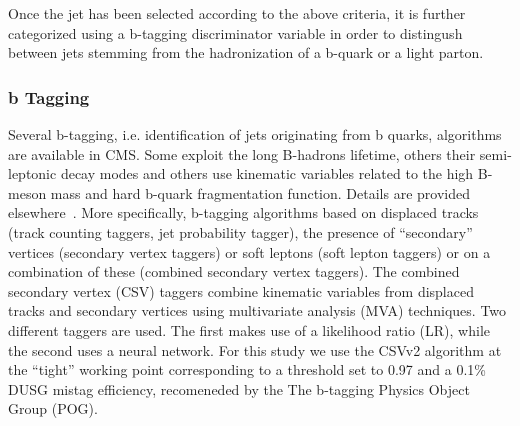  Once the jet has been selected according to the above criteria, it is further categorized using a b-tagging discriminator variable 
 in order to distingush between jets stemming from the hadronization of a b-quark or a light parton.

\subsubsection{b Tagging}

Several b-tagging, i.e. identification of jets originating from  b  quarks, algorithms are available in CMS. Some exploit the long B-hadrons lifetime, others their semi-leptonic decay modes and others use kinematic variables related to the high 
B-meson mass and hard b-quark fragmentation function. Details are provided elsewhere~\cite{CMS-PAS-BTV-10-001}. More specifically, b-tagging  algorithms  based  on  displaced  tracks (track counting taggers, jet probability tagger), the presence of ``secondary'' vertices (secondary vertex taggers) or soft leptons (soft lepton taggers) or on a combination of these (combined secondary vertex taggers).  The combined secondary vertex (CSV) taggers combine kinematic variables from displaced tracks and secondary vertices using multivariate analysis (MVA) techniques. Two different taggers are used.  The first makes use of a likelihood ratio (LR), while the second uses a neural network. 
For this study we use the CSVv2 algorithm at the ``tight'' working point corresponding to a threshold set to 0.97 and a 0.1\% DUSG mistag efficiency, recomeneded by the The b-tagging Physics Object Group (POG).
%
%
%
%
%
%
%
%
